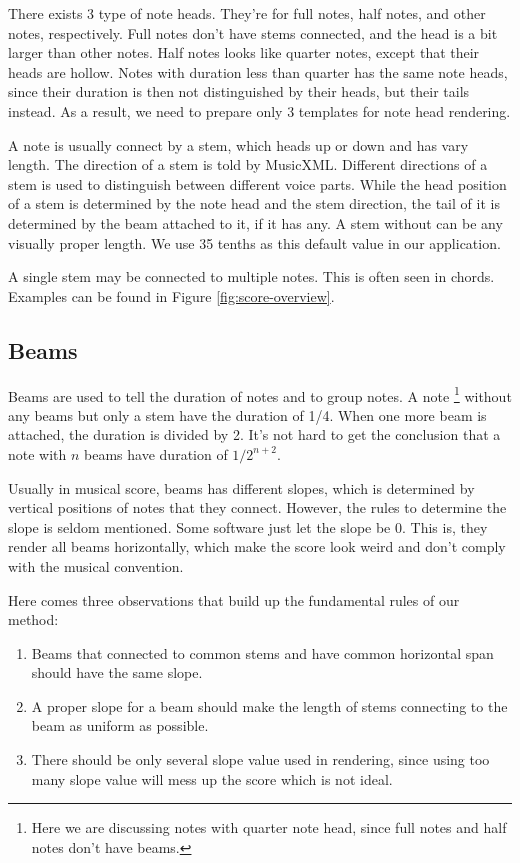 There exists 3 type of note heads. They're for full notes, half notes, and other notes, respectively. Full notes don't have stems connected, and the head is a bit larger than other notes. Half notes looks like quarter notes, except that their heads are hollow. Notes with duration less than quarter has the same note heads, since their duration is then not distinguished by their heads, but their tails instead. As a result, we need to prepare only 3 templates for note head rendering.
 
A note is usually connect by a stem, which heads up or down and has vary length. The direction of a stem is told by MusicXML. Different directions of a stem is used to distinguish between different voice parts. While the head position of a stem is determined by the note head and the stem direction, the tail of it is determined by the beam attached to it, if it has any. A stem without can be any visually proper length. We use 35 tenths as this default value in our application. 

A single stem may be connected to multiple notes. This is often seen in chords. Examples can be found in Figure \ref{fig:score-overview}.

\subsection{Beams}
Beams are used to tell the duration of notes and to group notes. A note \footnote{Here we are discussing notes with quarter note head, since full notes and half notes don't have beams. } without any beams but only a stem have the duration of 1/4. When one more beam is attached, the duration is divided by 2. It's not hard to get the conclusion that a note with $n$ beams have duration of $1 / 2^{n+2}$.

Usually in musical score, beams has different slopes, which is determined by vertical positions of notes that they connect. However, the rules to determine the slope is seldom mentioned. Some software just let the slope be 0. This is, they render all beams horizontally, which make the score look weird and don't comply with the musical convention. 

Here comes three observations that build up the fundamental rules of our method:
\begin{enumerate}
    \item 
        Beams that connected to common stems and have common horizontal span should have the same slope.
    \item
        A proper slope for a beam should make the length of stems connecting to the beam as uniform as possible. 
    \item 
        There should be only several slope value used in rendering, since using too many slope value will mess up the score which is not ideal.
\end{enumerate}


